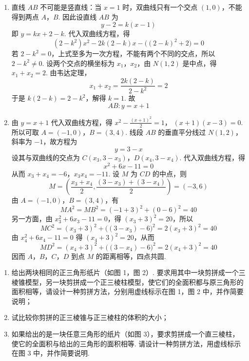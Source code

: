 \begin{solution}
\begin{enumerate}
\item 直线 \(AB\) 不可能是竖直线：当 \(x=1\) 时，双曲线只有一个交点 \((1,0)\)，不能得到两点 \(A\)，\(B\). 因此设直线 \(AB\) 为
\[
y-2=k(x-1)
\]
即 \(y=kx+2-k\). 代入双曲线方程，得
\[
(2-k^2)x^2-2k(2-k)x-\bigl((2-k)^2+2\bigr)=0
\]
若 \(2-k^2=0\)，上式至多为一次方程，不能有两个不同的交点，所以 \(2-k^2\ne0\). 设两个交点的横坐标为 \(x_1\)，\(x_2\)，由 \(N(1,2)\) 是中点，得 \(x_1+x_2=2\). 由韦达定理，
\[
x_1+x_2=\frac{2k(2-k)}{2-k^2}=2
\]
于是 \(k(2-k)=2-k^2\)，解得 \(k=1\). 故
\[
AB:y=x+1
\]

\item 由 \(y=x+1\) 代入双曲线方程，得
\(x^2-\frac{(x+1)^2}{2}=1\)，\(\; (x+1)(x-3)=0\).
所以可取 \(A=(-1,0)\)，\(B=(3,4)\). 线段 \(AB\) 的垂直平分线过 \(N(1,2)\)，斜率为 \(-1\)，故方程为
\[
y=3-x
\]
设其与双曲线的交点为 \(C(x_3,3-x_3)\)，\(D(x_4,3-x_4)\). 代入双曲线方程，得
\[
x^2+6x-11=0
\]
从而 \(x_3+x_4=-6\)，\(x_3x_4=-11\). 设 \(M\) 为 \(CD\) 的中点，则
\[
M=\left(\frac{x_3+x_4}{2},\frac{(3-x_3)+(3-x_4)}{2}\right)=(-3,6)
\]
由 \(A=(-1,0)\)，\(B=(3,4)\)，有
\[
MA^2=MB^2=(-1+3)^2+(0-6)^2=40
\]
另一方面，由 \(x_3^2+6x_3-11=0\)，得 \((x_3+3)^2=20\)，所以
\[
MC^2=(x_3+3)^2+\bigl((3-x_3)-6\bigr)^2=2(x_3+3)^2=40
\]
由 \(x_4^2+6x_4-11=0\) 得 \((x_4+3)^2=20\)，从而
\[
MD^2=(x_4+3)^2+\bigl((3-x_4)-6\bigr)^2=2(x_4+3)^2=40
\]
因而 \(A\)，\(B\)，\(C\)，\(D\) 到点 \(M\) 的距离相等，四点共圆.
\end{enumerate}
\end{solution}

\begin{problem}
\begin{enumerate}
\item 给出两块相同的正三角形纸片（如图 1，图 2）. 要求用其中一块剪拼成一个三棱锥模型，另一块剪拼成一个正三棱柱模型，使它们的全面积都与原三角形的面积相等，请设计一种剪拼方法，分别用虚线标示在图 1，图 2 中，并作简要说明；
\item 试比较你剪拼的正三棱锥与正三棱柱的体积的大小；
\item 如果给出的是一块任意三角形的纸片（如图 3），要求剪拼成一个直三棱柱，使它的全面积与给出的三角形的面积相等. 请设计一种剪拼方法，用虚线标示在图 3 中，并作简要说明.
\end{enumerate}

\end{problem}

